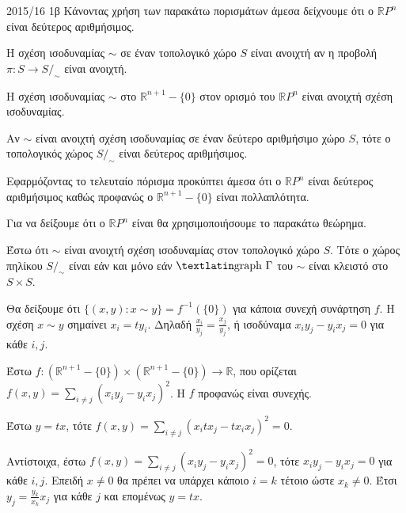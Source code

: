 \documentclass[a4paper,11pt]{article}
\begin{document}
\begin{solution}{2015/16 1β}
    Κάνοντας χρήση των παρακάτω πορισμάτων άμεσα δείχνουμε ότι ο \(
    \mathbb{R}P^n \) είναι δεύτερος αριθμήσιμος.
    \begin{defn}
        Η σχέση ισοδυναμίας \( \sim \) σε έναν τοπολογικό χώρο \( S \) είναι
        ανοιχτή αν η προβολή \( \pi: S \to S/_{\sim} \) είναι ανοιχτή.
    \end{defn}
    \begin{cor}
        Η σχέση ισοδυναμίας \( \sim \) στο \( \mathbb{R}^{n+1} - \{0\} \) στον
        ορισμό του \( \mathbb{R}P^n \) είναι ανοιχτή σχέση ισοδυναμίας.
    \end{cor}
    \begin{cor}
        Αν \( \sim \) είναι ανοιχτή σχέση ισοδυναμίας σε έναν δεύτερο αριθμήσιμο
        χώρο \( S \), τότε ο τοπολογικός χώρος \( S/_{\sim} \) είναι δεύτερος
        αριθμήσιμος.
    \end{cor}
    Εφαρμόζοντας το τελευταίο πόρισμα προκύπτει άμεσα ότι ο \( \mathbb{R}P^n \)
    είναι δεύτερος αριθμήσιμος καθώς προφανώς ο \( \mathbb{R}^{n+1} - \{0\} \)
    είναι πολλαπλότητα.

    Για να δείξουμε ότι ο \( \mathbb{R}P^n \) είναι  θα
    χρησιμοποιήσουμε το παρακάτω θεώρημα.
    \begin{thrm}
        Έστω ότι \( \sim \) είναι ανοιχτή σχέση ισοδυναμίας στον τοπολογικό χώρο
        \( S \). Τότε ο χώρος πηλίκου \( S/_{\sim} \) είναι  εάν
        και μόνο εάν \( \text{\tl{graph }}\Gamma \) του \( \sim \) είναι κλειστό
        στο \( S \times S \).
    \end{thrm}
    Θα δείξουμε ότι \( \{ (x, y): x \sim y \} = f^{-1}( \{0\} ) \) για κάποια
    συνεχή συνάρτηση \( f \). Η σχέση \( x \sim y \) σημαίνει \( x_i = t y_i \).
    Δηλαδή \( \frac{x_i}{y_j} = \frac{x_j}{y_j} \), ή ισοδύναμα \( x_iy_j -
    y_ix_j = 0 \) για κάθε \( i, j \).

    Έστω \( f: (\mathbb{R}^{n+1} - \{0\})
    \times (\mathbb{R}^{n+1} - \{0\}) \to \mathbb{R} \), που ορίζεται \( f(x, y)
    = \sum_{i \neq j} (x_iy_j - y_ix_j)^2 \). Η \( f \) προφανώς είναι συνεχής.

    Έστω \( y = t x \), τότε \( f(x, y) = \sum_{i \neq j} (x_itx_j - tx_ix_j)^2
    = 0 \).

    Αντίστοιχα, έστω \( f(x, y) = \sum_{i \neq j} (x_iy_j - y_ix_j)^2
    = 0 \), τότε \( x_iy_j - y_ix_j = 0 \) για κάθε \( i,j \). Επειδή \( x \neq
    0 \) θα πρέπει να υπάρχει κάποιο \( i = k \) τέτοιο ώστε \( x_k \neq 0 \).
    Έτσι \( y_j = \frac{y_k}{x_k}x_j \) για κάθε \( j \) και επομένως \( y = tx
    \).


\end{solution}
\end{document}
